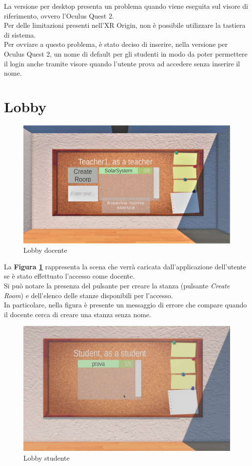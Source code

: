\hspace{-0.6cm}La versione per desktop presenta un problema quando viene eseguita sul visore di riferimento, ovvero l’Oculus Quest 2. 
\\Per delle limitazioni presenti nell'XR Origin, non è possibile utilizzare la tastiera di sistema. 
\\Per ovviare a questo problema, è stato deciso di inserire, nella versione per Oculus Quest 2, un nome di default per gli studenti in modo da poter permettere il login anche tramite visore quando l'utente prova ad accedere senza inserire il nome.
\section{Lobby}
\begin{figure}[H]
\centering
\includegraphics[scale = 0.25]{Immagini/Dimostrazioni d'uso/createroomerr.jpg}
\caption{Lobby docente}
\label{fig:5.3}
\end{figure}
La \textbf{Figura \ref{fig:5.3}} rappresenta la scena che verrà caricata dall'applicazione dell'utente se è stato effettuato l'accesso come docente.
\\Si può notare la presenza del pulsante per creare la stanza (pulsante \textit{Create Room}) e dell'elenco delle stanze disponibili per l'accesso.
\\In particolare, nella figura è presente un messaggio di errore che compare quando il docente cerca di creare una stanza senza nome.
\begin{figure}[H]
\centering
\includegraphics[scale = 0.25]{Immagini/Dimostrazioni d'uso/studlobby.jpg}
\caption{Lobby studente}
\label{fig:5.4}
\end{figure}
